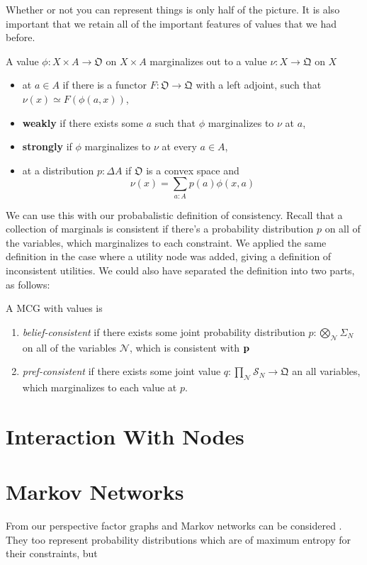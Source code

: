 \documentclass{article}
\begin{document}
	Whether or not you can represent things is only half of the picture. It is also important that we retain all of the important features of values that we had before. 
	
	\begin{defn}
		A value $\phi: X \times A \to \mathfrak O$ on $X \times A$ marginalizes out to a value $\nu: X \to \mathfrak Q$ on $X$  
		
		\begin{itemize}
			\item at $a \in A$ if there is a functor $F : \mathfrak O \to \mathfrak Q$ with a left adjoint, such that $\nu(x) \simeq F(\phi(a, x))$,
			\item \textbf{weakly} if there exists some $a$ such that $\phi$ marginalizes to $\nu$ at $a$,
			\item \textbf{strongly} if $\phi$ marginalizes to $\nu$ at every $a \in A$, 
			\item at a distribution $p : \Delta A$ if $\mathfrak O$ is a convex space and
				\[ \nu(x) = \sum_{a : A} p(a) \phi(x, a) \] 
		\end{itemize}
	\end{defn}

	We can use this with our probabalistic definition of consistency. Recall that a collection of marginals is consistent if there's a probability distribution $p$ on all of the variables, which marginalizes to each constraint. We applied the same definition in the case where a utility node was added, giving a definition of inconsistent utilities. We could also have separated the definition into two parts, as follows:
	
	\begin{defn}
		A MCG with values is 
		\begin{enumerate}
			\item \textit{belief-consistent} if there exists  some joint probability distribution $p : \bigotimes_{\mathcal N}  \Sigma_N $ on all of the variables $\mathcal N$, which is consistent with $\bf p$
			\item \textit{pref-consistent} if there exists some joint value $q : \prod_{\mathcal N} \mathcal S_N \to \mathfrak Q$ an all variables, which marginalizes to each value at $p$.
		\end{enumerate}
		
	\end{defn}

	\section{Interaction With Nodes}


	\section{Markov Networks}
	
	From our perspective factor graphs and Markov networks can be considered . They too represent probability distributions which are of maximum entropy for their constraints, but 
\end{document}
